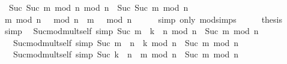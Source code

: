 \begin{isabellebody}
\ \ {\isachardoublequoteopen}Suc\ {\isacharparenleft}{\kern0pt}Suc\ {\isacharparenleft}{\kern0pt}m\ mod\ n{\isacharparenright}{\kern0pt}{\isacharparenright}{\kern0pt}\ mod\ n\ {\isacharequal}{\kern0pt}\ Suc\ {\isacharparenleft}{\kern0pt}Suc\ m{\isacharparenright}{\kern0pt}\ mod\ n{\isachardoublequoteclose}\isanewline
%
\isadelimproof
%
\endisadelimproof
%
\isatagproof
{}\isamarkupfalse%
\ {\isacharminus}{\kern0pt}\isanewline
\ \ \isamarkupfalse%
\ {\isachardoublequoteopen}{\isacharparenleft}{\kern0pt}m\ mod\ n\ {\isacharplus}{\kern0pt}\ {}{\isacharparenright}{\kern0pt}\ mod\ n\ {\isacharequal}{\kern0pt}\ {\isacharparenleft}{\kern0pt}m\ {\isacharplus}{\kern0pt}\ {}{\isacharparenright}{\kern0pt}\ mod\ n{\isachardoublequoteclose}\isanewline
\ \ \ \ \isamarkupfalse%
\ {\isacharparenleft}{\kern0pt}simp\ only{\isacharcolon}{\kern0pt}\ mod{\isacharunderscore}{\kern0pt}simps{\isacharparenright}{\kern0pt}\isanewline
\ \ \isamarkupfalse%
\ \isamarkupfalse%
\ {\isacharquery}{\kern0pt}thesis\isanewline
\ \ \ \ \isamarkupfalse%
\ simp\isanewline
{}\isamarkupfalse%
%
\endisatagproof
{\isafoldproof}%
%
\isadelimproof
\isanewline
%
\endisadelimproof
\isanewline
{}\isamarkupfalse%
\isanewline
\ \ Suc{\isacharunderscore}{\kern0pt}mod{\isacharunderscore}{\kern0pt}mult{\isacharunderscore}{\kern0pt}self{}\ {\isacharbrackleft}{\kern0pt}simp{\isacharbrackright}{\kern0pt}{\isacharcolon}{\kern0pt}\ {\isachardoublequoteopen}Suc\ {\isacharparenleft}{\kern0pt}m\ {\isacharplus}{\kern0pt}\ k\ {\isacharasterisk}{\kern0pt}\ n{\isacharparenright}{\kern0pt}\ mod\ n\ {\isacharequal}{\kern0pt}\ Suc\ m\ mod\ n{\isachardoublequoteclose}\isanewline
\ \ \ Suc{\isacharunderscore}{\kern0pt}mod{\isacharunderscore}{\kern0pt}mult{\isacharunderscore}{\kern0pt}self{}\ {\isacharbrackleft}{\kern0pt}simp{\isacharbrackright}{\kern0pt}{\isacharcolon}{\kern0pt}\ {\isachardoublequoteopen}Suc\ {\isacharparenleft}{\kern0pt}m\ {\isacharplus}{\kern0pt}\ n\ {\isacharasterisk}{\kern0pt}\ k{\isacharparenright}{\kern0pt}\ mod\ n\ {\isacharequal}{\kern0pt}\ Suc\ m\ mod\ n{\isachardoublequoteclose}\isanewline
\ \ \ Suc{\isacharunderscore}{\kern0pt}mod{\isacharunderscore}{\kern0pt}mult{\isacharunderscore}{\kern0pt}self{}\ {\isacharbrackleft}{\kern0pt}simp{\isacharbrackright}{\kern0pt}{\isacharcolon}{\kern0pt}\ {\isachardoublequoteopen}Suc\ {\isacharparenleft}{\kern0pt}k\ {\isacharasterisk}{\kern0pt}\ n\ {\isacharplus}{\kern0pt}\ m{\isacharparenright}{\kern0pt}\ mod\ n\ {\isacharequal}{\kern0pt}\ Suc\ m\ mod\ n{\isachardoublequoteclose}\isanewline

\end{isabellebody}
